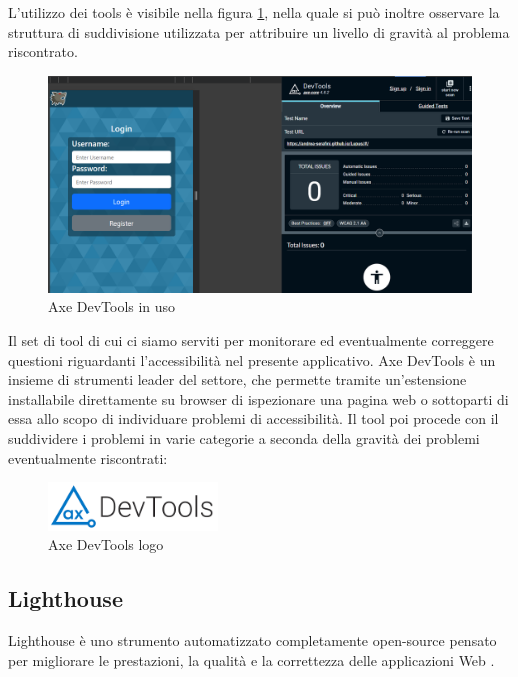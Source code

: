 L'utilizzo dei tools è visibile nella figura \ref{fig:axeDevTools}, nella quale si può inoltre osservare la struttura di suddivisione utilizzata per attribuire un livello di gravità al problema riscontrato.


\begin{figure}[H]
\centering
\includegraphics[width=\textwidth]{img/screen/axe_devtools_usage.png}
\caption{Axe DevTools in uso}
\label{fig:axeDevTools}
\end{figure}

Il set di tool di cui ci siamo serviti per monitorare ed eventualmente correggere questioni riguardanti l'accessibilità nel presente applicativo. Axe DevTools è un insieme di strumenti leader del settore, che permette tramite un'estensione installabile direttamente su browser di ispezionare una pagina web o sottoparti di essa allo scopo di individuare problemi di accessibilità. Il tool poi procede con il suddividere i problemi in varie categorie a seconda della gravità dei problemi eventualmente riscontrati:

\begin{figure}[H]
\centering
\includegraphics[width=0.4\textwidth]{img/logos/axeDevtools_logo.png}
\caption{Axe DevTools logo}
\label{fig:axeDevToolsLogo}
\end{figure}


\subsection{Lighthouse}
Lighthouse è uno strumento automatizzato completamente open-source pensato per migliorare le prestazioni, la qualità e la correttezza delle applicazioni Web \cite{githubLighthouse}.

